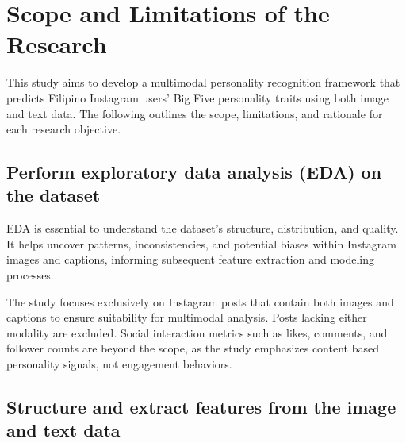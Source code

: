 %
%




\section{Scope and Limitations of the Research}
\label{sec:scopelimitations}


	This study aims to develop a multimodal personality recognition framework that predicts Filipino Instagram users’ Big Five personality traits using both image and text data. The following outlines the scope, limitations, and rationale for each research objective.
	\subsection{Perform exploratory data analysis (EDA) on the dataset}
	
	EDA is essential to understand the dataset’s structure, distribution, and quality. It helps uncover patterns, inconsistencies, and potential biases within Instagram images and captions, informing subsequent feature extraction and modeling processes.
	
	The study focuses exclusively on Instagram posts that contain both images and captions to ensure suitability for multimodal analysis. Posts lacking either modality are excluded. Social interaction metrics such as likes, comments, and follower counts are beyond the scope, as the study emphasizes content based personality signals, not engagement behaviors.
	
	\subsection{Structure and extract features from the image and text data}
	
